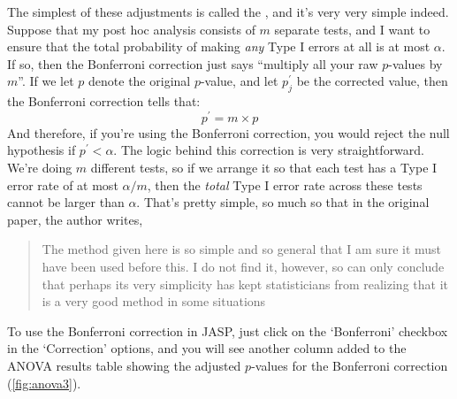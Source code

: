
The simplest of these adjustments is called the  \parencite{Dunn1961}, and it's very very simple indeed. Suppose that my post hoc analysis consists of $m$ separate tests, and I want to ensure that the total probability of making {\it any} Type I errors at all is at most $\alpha$. If so, then the Bonferroni correction just says ``multiply all your raw $p$-values by $m$''. If we let $p$ denote the original $p$-value, and let $p^\prime_j$ be the corrected value, then the Bonferroni correction tells that:
$$
p^\prime = m \times p
$$
And therefore, if you're using the Bonferroni correction, you would reject the null hypothesis if $p^\prime < \alpha$. The logic behind this correction is very straightforward. We're doing $m$ different tests, so if we arrange it so that each test has a Type I error rate of at most $\alpha / m$, then the {\it total} Type I error rate across these tests cannot be larger than $\alpha$. That's pretty simple, so much so that in the original paper, the author writes,
\begin{quote}
The method given here is so simple and so general that I am sure it must have been used before this. I do not find it, however, so can only conclude that perhaps its very simplicity has kept statisticians from realizing that it is a very good method in some situations \parencite[pp 52-53]{Dunn1961}
\end{quote}
To use the Bonferroni correction in JASP, just click on the `Bonferroni' checkbox in the `Correction' options, and you will see another column added to the ANOVA results table showing the adjusted $p$-values for the Bonferroni correction (\ref{fig:anova3}).



